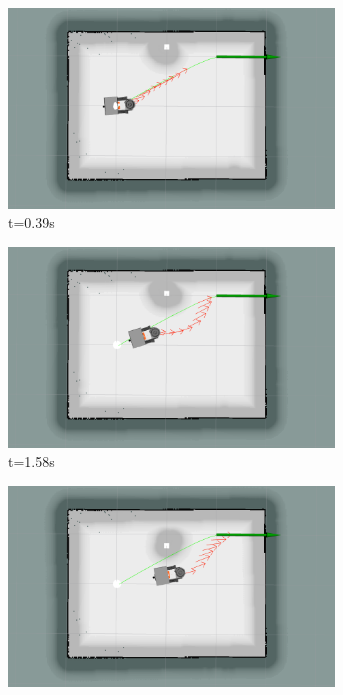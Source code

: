 \begin{figure}[H]
    \centering
    \begin{subfigure}[b]{0.50\linewidth}
        \centering
        \includegraphics[width=0.95\textwidth]{images/teb_single_1_obs/1/5039.png}
        \caption{t=0.39s}
    \end{subfigure}%
    \begin{subfigure}[b]{0.50\linewidth}
        \centering
        \includegraphics[width=0.95\textwidth]{images/teb_single_1_obs/1/5158.png}
        \caption{t=1.58s}
    \end{subfigure}
    \begin{subfigure}[b]{0.50\linewidth}
        \centering
        \includegraphics[width=0.95\textwidth]{images/teb_single_1_obs/1/5267.png}

\end{subfigure}
\end{figure}
